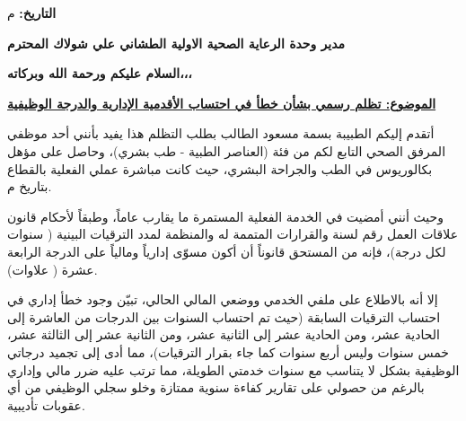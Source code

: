 \documentclass[12pt, a4paper]{extarticle}
\begin{document}
\noindent \textbf{التاريخ:} \hspace{0.2cm}  م

\vspace{1cm}

\noindent \textbf{مدير وحدة الرعاية الصحية الاولية الطشاني علي شولاك المحترم} 

\vspace{0.8cm}

\begin{center}
    \textbf{السلام عليكم ورحمة الله وبركاته،،،}
\end{center}

\vspace{0.4cm}

\begin{center}
    \large{\textbf{\uline{الموضوع: تظلم رسمي بشأن خطأ في احتساب الأقدمية الإدارية والدرجة الوظيفية}}}
\end{center}

\vspace{0.6cm}

أتقدم إليكم الطبيبة بسمة مسعود الطالب بطلب التظلم هذا يفيد بأنني أحد موظفي المرفق الصحي التابع لكم من فئة (العناصر الطبية - طب بشري)، وحاصل على مؤهل بكالوريوس في الطب والجراحة البشري، حيث كانت مباشرة عملي الفعلية بالقطاع بتاريخ  م.
    
\vspace{0.3cm}

وحيث أنني أمضيت في الخدمة الفعلية المستمرة ما يقارب  عاماً، وطبقاً لأحكام قانون علاقات العمل رقم  لسنة  والقرارات المتممة له والمنظمة لمدد الترقيات البينية ( سنوات لكل درجة)، فإنه من المستحق قانوناً أن أكون مسوّى إدارياً ومالياً على الدرجة الرابعة عشرة ( علاوات).
    
\vspace{0.3cm}

إلا أنه بالاطلاع على ملفي الخدمي ووضعي المالي الحالي، تبيّن وجود خطأ إداري في احتساب الترقيات السابقة (حيث تم احتساب السنوات بين الدرجات من العاشرة إلى الحادية عشر، ومن الحادية عشر إلى الثانية عشر، ومن الثانية عشر إلى الثالثة عشر، خمس سنوات وليس أربع سنوات كما جاء بقرار الترقيات)، مما أدى إلى تجميد درجاتي الوظيفية بشكل لا يتناسب مع سنوات خدمتي الطويلة، مما ترتب عليه ضرر مالي وإداري بالرغم من حصولي على تقارير كفاءة سنوية ممتازة وخلو سجلي الوظيفي من أي عقوبات تأديبية.
\end{document}
